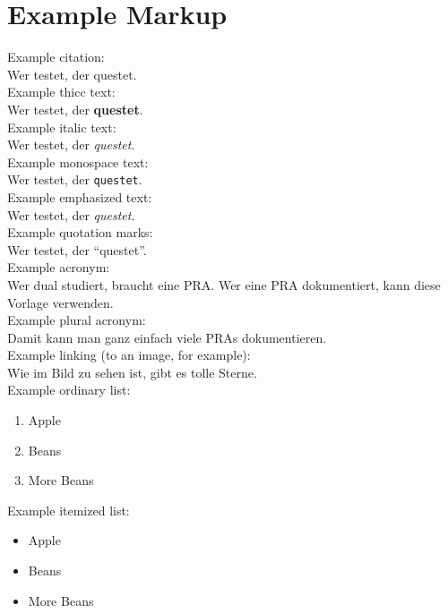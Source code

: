 %
%

\chapter{Example Markup}

Example citation:\\
Wer testet, der questet.\cite{bib:vodafone-legt-in-pirmasens}\\

Example thicc text:\\
Wer testet, der \textbf{questet}.\\

Example italic text:\\
Wer testet, der \textit{questet}.\\

Example monospace text:\\
Wer testet, der \texttt{questet}.\\

Example emphasized text:\\
Wer testet, der \emph{questet}.\\

Example quotation marks:\\
Wer testet, der \enquote{questet}.\\

Example acronym:\\
Wer dual studiert, braucht eine \ac{PRA}. Wer eine \ac{PRA} dokumentiert, kann diese Vorlage verwenden.\\

Example plural acronym:\\
Damit kann man ganz einfach viele \acp{PRA} dokumentieren.\\

Example linking (to an image, for example):\\
Wie im Bild  zu sehen ist, gibt es tolle Sterne.\\

Example ordinary list:\\
\begin{enumerate}
    \item Apple
    \item Beans
    \item More Beans
\end{enumerate}

Example itemized list:\\
\begin{itemize}
    \item Apple
    \item Beans
    \item More Beans
\end{itemize}

